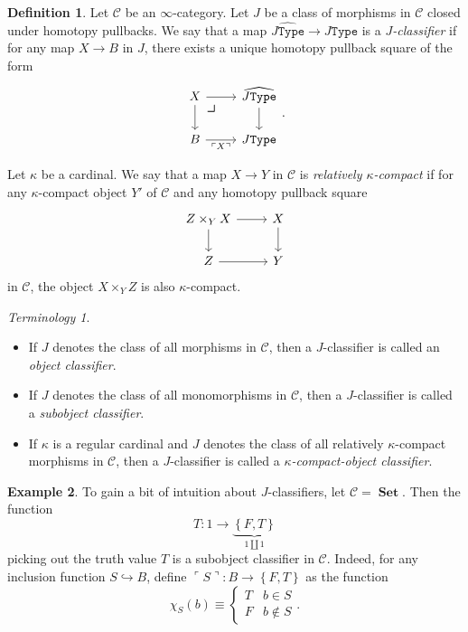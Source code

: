 \documentclass[10pt,letterpaper,cm]{nupset}
\theoremstyle{definition}
\newtheorem{definition}{Definition}[subsection]
\newtheorem{exmp}[definition]{Example}
\theoremstyle{theorem}
\theoremstyle{remark}
\newtheorem*{term}{Terminology}
\newcommand{\0}{\mathbf{0}}
\newcommand{\1}{\mathbf{1}}
\newcommand{\2}{\mathbf{2}}
\DeclareMathOperator{\set}{\mathbf{Set}}
\renewcommand{\c}{\mathscr{C}}
\newcommand{\bi}{\begin{itemize}}
\newcommand{\ei}{\end{itemize}}
\begin{document}
\begin{definition}\label{objclass}
  Let $\c$ be an $\infty$-category. Let $J$ be a class of morphisms in $\c$ closed under homotopy pullbacks. We say that a map $\widehat{J\mathtt{Type}} \to J\mathtt{Type}$ is a \textit{$J$-classifier} if for any map $X\to B$ in $J$, there exists a unique homotopy pullback square of the form
\[
\begin{tikzcd}
X \arrow[d] \arrow[r] 
\arrow[dr, phantom, "\scalebox{1.5}{\color{black}$\lrcorner$}" , very near start, color=black]
& \widehat{J\mathtt{Type}} \arrow[d] \\
B \arrow[r, "\ulcorner{X}\urcorner"']           & J\mathtt{Type}                    
\end{tikzcd}.
\]
\end{definition}

\smallskip

  Let $\kappa$ be a cardinal. We say that a map $X \to Y$ in $\c$ is \textit{relatively $\kappa$-compact} if for any $\kappa$-compact object $Y'$ of $\c$ and any homotopy pullback square
\[
\begin{tikzcd}
Z\times_YX \arrow[d] \arrow[r] & X \arrow[d] \\
Z \arrow[r]                    & Y          
\end{tikzcd}
\] in $\c$, 
the object $X\times_{Y}Z$ is also $\kappa$-compact.

\begin{term} $ $
\bi
\item If $J$ denotes the  class of all morphisms in $\c$, then a $J$-classifier is called an \textit{object classifier}.
\item If $J$ denotes the class of all monomorphisms in $\c$, then a $J$-classifier is called a \textit{subobject classifier}.
\item If $\kappa$ is a regular cardinal and $J$ denotes the class of all relatively $\kappa$-compact morphisms in $\c$, then a $J$-classifier is called a \textit{$\kappa$-compact-object classifier}.
\ei
\end{term}

\begin{exmp}
To gain a bit of intuition about $J$-classifiers, let $\c = \set$. Then the function $$T: 1 \to \underbrace{\left\{F,T\right\}}_{1 \coprod 1}$$ picking out the truth value $T$ is a subobject classifier in $\c$. Indeed, for any inclusion function $S \hookrightarrow B$, define $\ulcorner{S}\urcorner : B \to \left\{F,T\right\}$ as the function 
\[
\chi_S(b) \equiv \begin{cases}
T & b\in S
\\ F & b\notin S
\end{cases}.
\]
\end{exmp}
\end{document}
